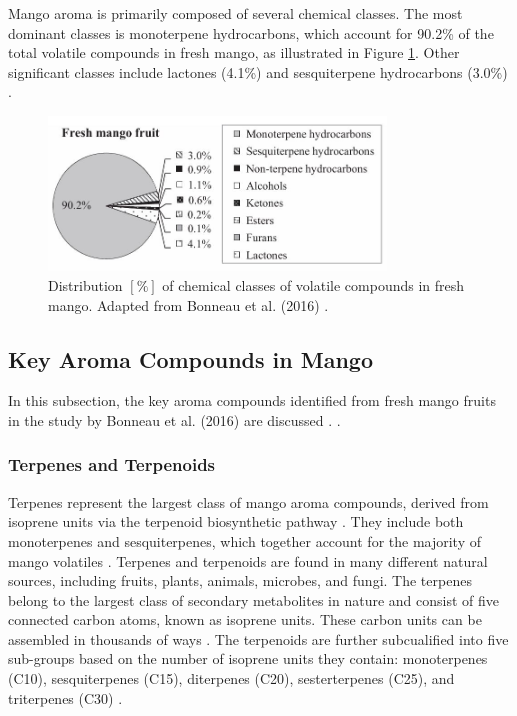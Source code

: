 Mango aroma is primarily composed of several chemical classes. The most dominant classes is monoterpene hydrocarbons, which account for 90.2\% of the total volatile compounds in fresh mango, as illustrated in Figure \ref{fig:mango_aroma_compounds}. Other significant classes include lactones (4.1\%) and sesquiterpene hydrocarbons (3.0\%) \cite*{A07_Bonneau2016}. 

\begin{figure}
    \centering
    \includegraphics[width=0.8\textwidth]{Figures/fig_fresh_mango_chemical_classes.JPG}
    \caption{Distribution $[\%]$ of chemical classes of volatile compounds in fresh mango. Adapted from Bonneau et al. (2016) \cite*{A07_Bonneau2016}.}
    \label{fig:mango_aroma_compounds}
\end{figure}

\subsection{Key Aroma Compounds in Mango}
In this subsection, the key aroma compounds identified from fresh mango fruits in the study by Bonneau et al. (2016) are discussed \cite*{A07_Bonneau2016}. .

\subsubsection{Terpenes and Terpenoids}
Terpenes represent the largest class of mango aroma compounds, derived from isoprene units via the terpenoid biosynthetic pathway \cite*{A09_Barras2024}. They include both monoterpenes and sesquiterpenes, which together account for the majority of mango volatiles \cite*{A07_Bonneau2016}. Terpenes and terpenoids are found in many different natural sources, including fruits, plants, animals, microbes, and fungi. The terpenes belong to the largest class of secondary metabolites in nature and consist of five connected carbon atoms, known as isoprene units. These carbon units can be assembled in thousands of ways \cite*{B01_TerpenesTerpenoids_2018}. The terpenoids are further subcualified into five sub-groups based on the number of isoprene units they contain: monoterpenes (C10), sesquiterpenes (C15), diterpenes (C20), sesterterpenes (C25), and triterpenes (C30) \cite*{B01_TerpenesTerpenoids_2018}.

